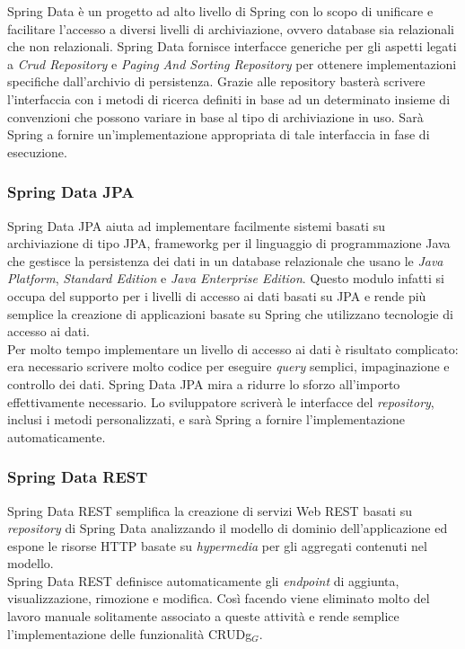Spring Data è un progetto ad alto livello di Spring con lo scopo di unificare e facilitare l'accesso a diversi livelli di archiviazione, ovvero database sia relazionali che non relazionali. Spring Data fornisce interfacce generiche per gli aspetti legati a \textit{Crud Repository} e \textit{Paging And Sorting Repository} per ottenere implementazioni specifiche dall'archivio di persistenza. Grazie alle repository basterà scrivere l'interfaccia con i metodi di ricerca definiti in base ad un determinato insieme di convenzioni che possono variare in base al tipo di archiviazione in uso. Sarà Spring  a fornire un'implementazione appropriata di tale interfaccia in fase di esecuzione.

\subsubsection{Spring Data JPA}
\label{subsubsec:spring-data-jpa}

Spring Data JPA aiuta ad implementare facilmente sistemi basati su archiviazione di tipo JPA, \gls{frameworkg} per il linguaggio di programmazione Java che gestisce la persistenza dei dati in un database relazionale che usano le \textit{Java Platform}, \textit{Standard Edition} e \textit{Java Enterprise Edition}. Questo modulo infatti si occupa del supporto per i livelli di accesso ai dati basati su JPA e rende più semplice la creazione di applicazioni basate su Spring che utilizzano tecnologie di accesso ai dati.\\
Per molto tempo implementare un livello di accesso ai dati è risultato complicato: era necessario scrivere molto codice per eseguire \textit{query} semplici, impaginazione e controllo dei dati. Spring Data JPA mira a ridurre lo sforzo all'importo effettivamente necessario. Lo sviluppatore scriverà le interfacce del \textit{repository}, inclusi i metodi personalizzati, e sarà Spring a fornire l'implementazione automaticamente.

\subsubsection{Spring Data REST}
\label{subsubsec:spring-data-rest}

Spring Data REST semplifica la creazione di servizi Web REST basati su \textit{repository} di Spring Data analizzando il modello di dominio dell'applicazione ed espone le risorse HTTP basate su \textit{hypermedia} per gli aggregati contenuti nel modello.\\
Spring Data REST definisce automaticamente gli \textit{endpoint} di aggiunta, visualizzazione, rimozione e modifica. Così facendo viene eliminato molto del lavoro manuale solitamente associato a queste attività e rende semplice l'implementazione delle funzionalità \gls{CRUDg}$_G$.  

